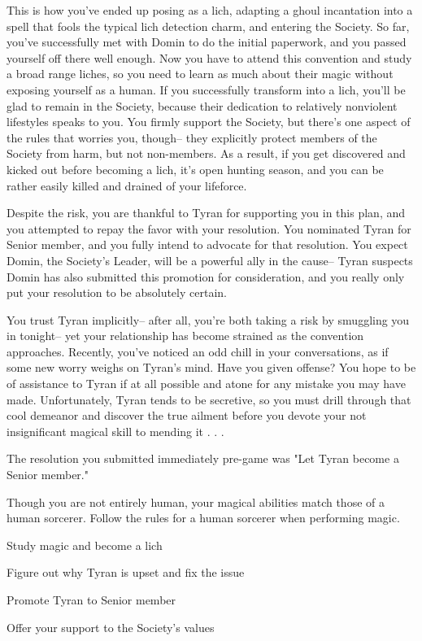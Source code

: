 \documentclass[char]{Sel}
\begin{document}
This is how you've ended up posing as a lich, adapting a ghoul incantation into a spell that fools the typical lich detection charm, and entering the Society. So far, you've successfully met with Domin to do the initial paperwork, and you passed yourself off there well enough. Now you have to attend this convention and study a broad range liches, so you need to learn as much about their magic without exposing yourself as a human. If you successfully transform into a lich, you'll be glad to remain in the Society, because their dedication to relatively nonviolent lifestyles speaks to you. You firmly support the Society, but there's one aspect of the rules that worries you, though-- they explicitly protect members of the Society from harm, but not non-members. As a result, if you get discovered and kicked out before becoming a lich, it's open hunting season, and you can be rather easily killed and drained of your lifeforce.

Despite the risk, you are thankful to Tyran for supporting you in this plan, and you attempted to repay the favor with your resolution. You nominated Tyran for Senior member, and you fully intend to advocate for that resolution. You expect Domin, the Society’s Leader, will be a powerful ally in the cause-- Tyran suspects Domin has also submitted this promotion for consideration, and you really only put your resolution to be absolutely certain.

You trust Tyran implicitly-- after all, you're both taking a risk by smuggling you in tonight-- yet your relationship has become strained as the convention approaches. Recently, you've noticed an odd chill in your conversations, as if some new worry weighs on Tyran's mind. Have you given offense? You hope to be of assistance to Tyran if at all possible and atone for any mistake you may have made. Unfortunately, Tyran tends to be secretive, so you must drill through that cool demeanor and discover the true ailment before you devote your not insignificant magical skill to mending it . . .

\begin{itemz}[Notes]
  \item The resolution you submitted immediately pre-game was "Let Tyran become a Senior member."
   \item Though you are not entirely human, your magical abilities match those of a human sorcerer. Follow the rules for a human sorcerer when performing magic.
    \end{itemz}
    
 \begin{itemz}[Goals]
\item Study magic and become a lich
\item Figure out why Tyran is upset and fix the issue
\item Promote Tyran to Senior member 
\item Offer your support to the Society's values
\end{itemz}
\end{document}
